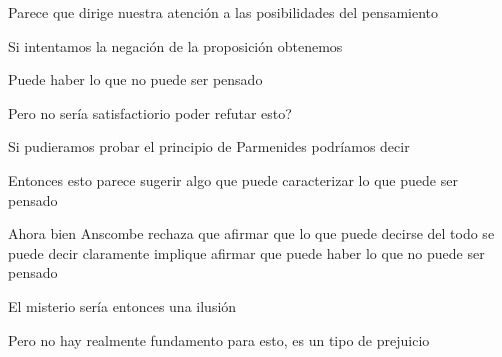 Parece que dirige nuestra atención a las posibilidades del pensamiento

Si intentamos la negación de la proposición obtenemos

Puede haber lo que no puede ser pensado

Pero no sería satisfactiorio poder refutar esto?

Si pudieramos probar el principio de Parmenides podríamos decir

Entonces esto parece sugerir algo que puede caracterizar lo que puede ser pensado

Ahora bien Anscombe rechaza que afirmar que lo que puede decirse del todo se puede decir claramente implique afirmar que puede haber lo que no puede ser pensado

El misterio sería entonces una ilusión

Pero no hay realmente fundamento para esto, es un tipo de prejuicio



